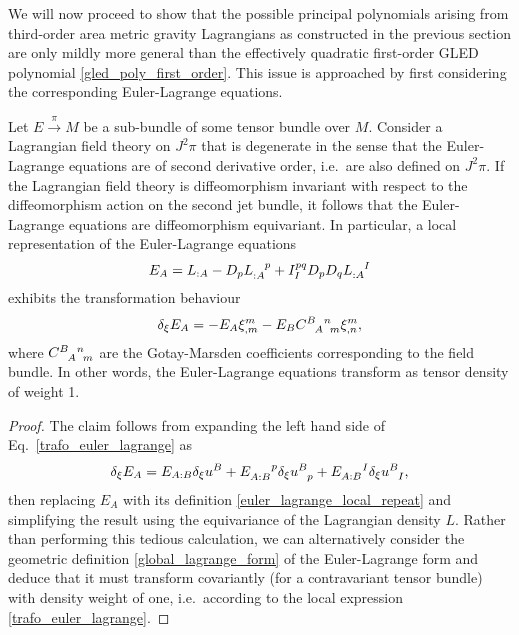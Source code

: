 We will now proceed to show that the possible principal polynomials arising from third-order area metric gravity Lagrangians as constructed in the previous section are only mildly more general than the effectively quadratic first-order GLED polynomial \eqref{gled_poly_first_order}. This issue is approached by first considering the corresponding Euler-Lagrange equations.

\begin{proposition}\label{prop_euler_tensor}
  Let $E\overset{\pi}{\longrightarrow}M$ be a sub-bundle of some tensor bundle over $M$. Consider a Lagrangian field theory on $J^2\pi$ that is degenerate in the sense that the Euler-Lagrange equations are of second derivative order, i.e.~are also defined on $J^2\pi$. If the Lagrangian field theory is diffeomorphism invariant with respect to the diffeomorphism action on the second jet bundle, it follows that the Euler-Lagrange equations are diffeomorphism equivariant. In particular, a local representation of the Euler-Lagrange equations
  \begin{equation}\label{euler_lagrange_local_repeat}
  E_A = L_{:A} - D_p L_{:A}^{\hphantom{:A}p} + I_I^{pq} D_p D_q L_{:A}^{\hphantom{:A}I}
  \end{equation}
  exhibits the transformation behaviour
  \begin{equation}\label{trafo_euler_lagrange}
    \delta_\xi E_A = -E_A \xi^m_{,m} - E_B \gmc{B}{A}{n}{m} \xi^m_{,n},
  \end{equation}
  where $\gmc{B}{A}{n}{m}$ are the Gotay-Marsden coefficients corresponding to the field bundle. In other words, the Euler-Lagrange equations transform as tensor density of weight 1.
\end{proposition}
\begin{proof}
  The claim follows from expanding the left hand side of Eq.~\ref{trafo_euler_lagrange} as
  \begin{equation}
    \delta_\xi E_A = E_{A:B} \delta_\xi u^B + E_{A:B}^{\hphantom{A:B}p} \delta_\xi u^B_{\hphantom Bp} + E_{A:B}^{\hphantom{A:B}I} \delta_\xi u^B_{\hphantom BI},
  \end{equation}
  then replacing $E_A$ with its definition \eqref{euler_lagrange_local_repeat} and simplifying the result using the equivariance of the Lagrangian density $L$. Rather than performing this tedious calculation, we can alternatively consider the geometric definition \ref{global_lagrange_form} of the Euler-Lagrange form and deduce that it must transform covariantly (for a contravariant tensor bundle) with density weight of one, i.e.~according to the local expression \eqref{trafo_euler_lagrange}.
\end{proof}
